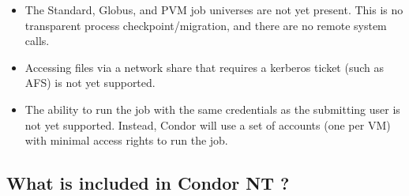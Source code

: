 \begin{itemize}

\item The Standard, Globus, and PVM job universes are not yet present.
This is no transparent process checkpoint/migration, and there are no
remote system calls.

\item Accessing files via a network share that requires a kerberos ticket
(such as AFS) is not yet supported.

\item The ability to run the job with the same credentials as the
submitting user is not yet supported.  Instead, Condor will use a set
of accounts (one per VM) with minimal access rights to run the job.

\end{itemize}

\subsection{What is included in Condor NT \VersionNotice?}

